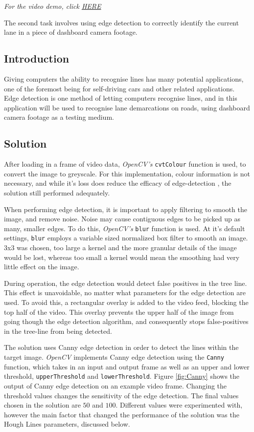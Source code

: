 \documentclass[conference]{IEEEtran}
\begin{document}
\textit{For the video demo, click \href{https://youtu.be/0gAxKX7zGAQ}{HERE}}

The second task involves using edge detection to correctly identify the current lane in a piece of dashboard camera footage. 
\subsection{Introduction}
Giving computers the ability to recognise lines has many potential applications, one of the foremost being for self-driving cars and other related applications. Edge detection is one method of letting computers recognise lines, and in this application will be used to recognise lane demarcations on roads, using dashboard camera footage as a testing medium.
\subsection{Solution}\label{2_solution}
After loading in a frame of video data, \textit{OpenCV's} \verb|cvtColour| function is used, to convert the image to greyscale. For this implementation, colour information is not necessary, and while it's loss does reduce the efficacy of edge-detection \cite{GreyVSColor}, the solution still performed adequately.  

When performing edge detection, it is important to apply filtering to smooth the image, and remove noise. Noise may cause contiguous edges to be picked up as many, smaller edges.  To do this, \textit{OpenCV's} \verb|blur| function is used. At it's default settings, \verb|blur| employs a variable sized normalized box filter to smooth an image\cite{BlurDocs}. $3$x$3$ was chosen, too large a kernel and the more granular details of the image would be lost, whereas too small a kernel would mean the smoothing had very little effect on the image.

During operation, the edge detection would detect false positives in the tree line. This effect is unavoidable, no matter what parameters for the edge detection are used. To avoid this, a rectangular overlay is added to the video feed, blocking the top half of the video. This overlay prevents the upper half of the image from going though the edge detection algorithm, and consequently stops false-positives in the tree-line from being detected.

The solution uses Canny edge detection in order to detect the lines within the target image. \textit{OpenCV} implements Canny edge detection using the \verb|Canny| function\cite{8265710}, which takes in an input and output frame as well as an upper and lower threshold, \verb|upperThreshold| and \verb|lowerThreshold|. Figure \ref{fig:Canny} shows the output of Canny edge detection on an example video frame. Changing the threshold values changes the sensitivity of the edge detection. The final values chosen in the solution are $50$ and $100$. Different values were experimented with, however the main factor that changed the performance of the solution was the Hough Lines parameters, discussed below. 
\end{document}
